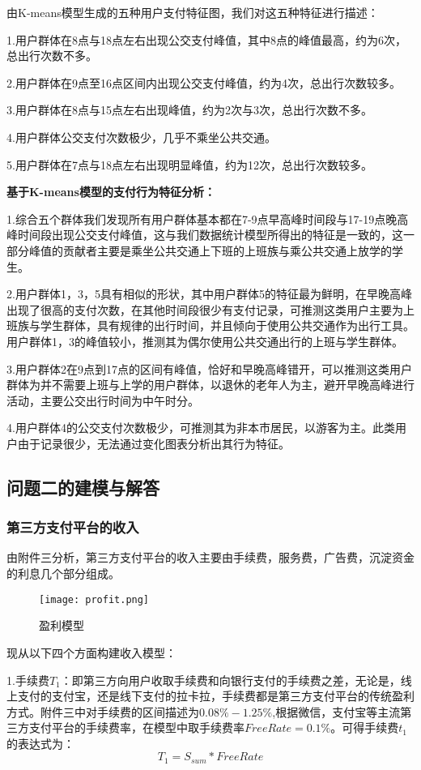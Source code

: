 \documentclass[withoutpreface,bwprint]{cumcmthesis} %
\begin{document}
由K-means模型生成的五种用户支付特征图，我们对这五种特征进行描述：

1.用户群体在8点与18点左右出现公交支付峰值，其中8点的峰值最高，约为6次，总出行次数不多。

2.用户群体在9点至16点区间内出现公交支付峰值，约为4次，总出行次数较多。

3.用户群体在8点与15点左右出现峰值，约为2次与3次，总出行次数不多。

4.用户群体公交支付次数极少，几乎不乘坐公共交通。

5.用户群体在7点与18点左右出现明显峰值，约为12次，总出行次数较多。

\textbf{基于K-means模型的支付行为特征分析：}

1.综合五个群体我们发现所有用户群体基本都在7-9点早高峰时间段与17-19点晚高峰时间段出现公交支付峰值，这与我们数据统计模型所得出的特征是一致的，这一部分峰值的贡献者主要是乘坐公共交通上下班的上班族与乘公共交通上放学的学生。

2.用户群体1，3，5具有相似的形状，其中用户群体5的特征最为鲜明，在早晚高峰出现了很高的支付次数，在其他时间段很少有支付记录，可推测这类用户主要为上班族与学生群体，具有规律的出行时间，并且倾向于使用公共交通作为出行工具。用户群体1，3的峰值较小，推测其为偶尔使用公共交通出行的上班与学生群体。

3.用户群体2在9点到17点的区间有峰值，恰好和早晚高峰错开，可以推测这类用户群体为并不需要上班与上学的用户群体，以退休的老年人为主，避开早晚高峰进行活动，主要公交出行时间为中午时分。

4.用户群体4的公交支付次数极少，可推测其为非本市居民，以游客为主。此类用户由于记录很少，无法通过变化图表分析出其行为特征。

\subsection{问题二的建模与解答}
\subsubsection{第三方支付平台的收入}
由附件三分析，第三方支付平台的收入主要由手续费，服务费，广告费，沉淀资金的利息几个部分组成。
\begin{figure}[h]
\centering
\texttt{[image: profit.png]}
\caption{盈利模型}
\end{figure}
现从以下四个方面构建收入模型：

1.手续费$T_1$：即第三方向用户收取手续费和向银行支付的手续费之差，无论是，线上支付的支付宝，还是线下支付的拉卡拉，手续费都是第三方支付平台的传统盈利方式。附件三中对手续费的区间描述为$0.08\%-1.25\%$,根据微信，支付宝等主流第三方支付平台的手续费率，在模型中取手续费率$FreeRate=0.1\%$。可得手续费$t_1$的表达式为：
\begin{equation}
T_1=S_{sum}*FreeRate
\end{equation}
\end{document}
